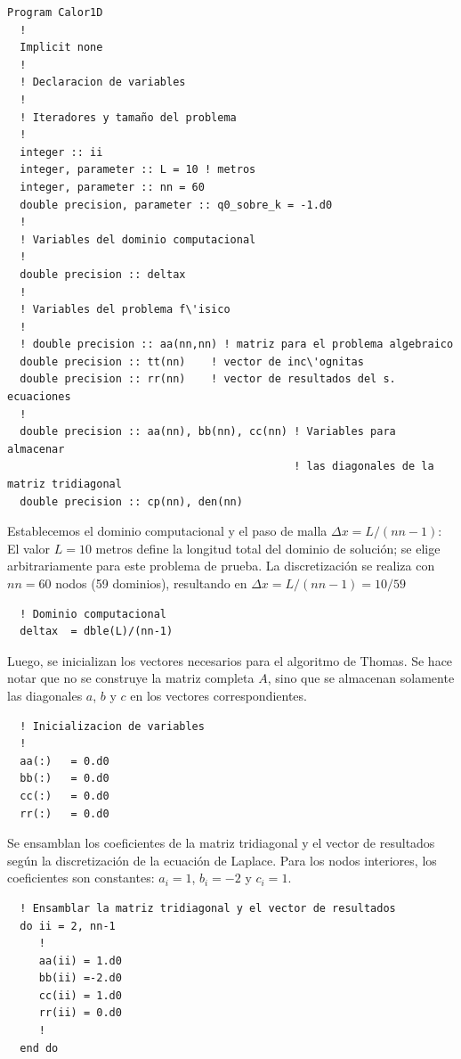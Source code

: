 \documentclass[11pt,a4paper]{article}
\begin{document}
\begin{verbatim}
Program Calor1D
  !
  Implicit none
  !
  ! Declaracion de variables
  !
  ! Iteradores y tamaño del problema
  !
  integer :: ii
  integer, parameter :: L = 10 ! metros
  integer, parameter :: nn = 60
  double precision, parameter :: q0_sobre_k = -1.d0
  !
  ! Variables del dominio computacional
  !
  double precision :: deltax
  !
  ! Variables del problema f\'isico
  !
  ! double precision :: aa(nn,nn) ! matriz para el problema algebraico
  double precision :: tt(nn)    ! vector de inc\'ognitas
  double precision :: rr(nn)    ! vector de resultados del s. ecuaciones
  !
  double precision :: aa(nn), bb(nn), cc(nn) ! Variables para almacenar
                                             ! las diagonales de la matriz tridiagonal
  double precision :: cp(nn), den(nn)
\end{verbatim}

Establecemos el dominio computacional y el paso de malla $ \Delta x = L/(nn - 1)$:
El valor $L=10$ metros define la longitud total del dominio de soluci\'on; se elige
arbitrariamente para este problema de prueba. La discretizaci\'on se realiza 
con $nn=60$ nodos (59 dominios), resultando en $ \Delta x = L/(nn-1) = 10/59 $

\begin{verbatim}
  ! Dominio computacional
  deltax  = dble(L)/(nn-1)
\end{verbatim}

Luego, se inicializan los vectores necesarios para el algoritmo de Thomas.
Se hace notar que no se construye la matriz completa $A$, sino que se almacenan 
solamente las diagonales $a$, $b$ y $c$ en los vectores correspondientes.

\begin{verbatim}
  ! Inicializacion de variables
  !
  aa(:)   = 0.d0
  bb(:)   = 0.d0
  cc(:)   = 0.d0
  rr(:)   = 0.d0
\end{verbatim}

Se ensamblan los coeficientes de la matriz tridiagonal y el vector de resultados
seg\'un la discretizaci\'on de la ecuaci\'on de Laplace. Para los nodos 
interiores, los coeficientes son constantes: $a_i=1$, $b_i=-2$ y $c_i=1$.

\begin{verbatim}
  ! Ensamblar la matriz tridiagonal y el vector de resultados
  do ii = 2, nn-1
     !
     aa(ii) = 1.d0
     bb(ii) =-2.d0
     cc(ii) = 1.d0
     rr(ii) = 0.d0
     !
  end do
\end{verbatim}
\end{document}

